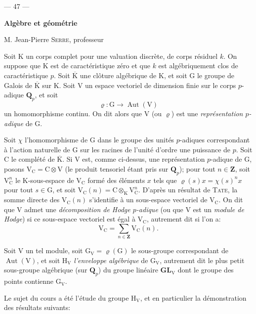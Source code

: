 \begin{center}--- 47 ---\end{center}

\begin{center}\textbf{Algèbre et géométrie}

M. Jean-Pierre \textsc{Serre}, professeur\end{center}

Soit $\mathrm K$ un corps complet pour une valuation discrète, de corps résiduel $k$. On suppose que $\mathrm K$ est de caractéristique zéro et que $k$ est algébriquement clos de caractéristique $p$. Soit $\overline{\mathrm K}$ une clôture algébrique de $\mathrm K$, et soit $\mathrm G$ le groupe de Galois de $\overline{\mathrm K}$ sur $\mathrm K$. Soit $\mathrm V$ un espace vectoriel de dimension finie sur le corps $p$-adique $\mathbf Q_p$, et soit
\[
\varrho:\mathrm G\to\operatorname{Aut}(\mathrm V)
\]
un homomorphisme continu. On dit alors que $\mathrm V$ (ou $\varrho$) est une \textit{représentation $p$-adique} de $\mathrm G$.

Soit $\chi$ l'homomorphisme de $\mathrm G$ dans le groupe des unités $p$-adiques correspondant à l'action naturelle de $\mathrm G$ sur les racines de l'unité d'ordre une puissance de $p$. Soit $\mathrm C$ le complété de $\overline{\mathrm K}$. Si $\mathrm V$ est, comme ci-dessus, une représentation $p$-adique de $\mathrm G$, posons $\mathrm V_{\mathrm C}=\mathrm C\otimes\mathrm V$ (le produit tensoriel étant pris sur $\mathbf Q_p$); pour tout $n\in\mathbf Z$, soit $\mathrm V_{\mathrm C}^n$ le $\mathrm K$-sous-espace de $\mathrm V_{\mathrm C}$ formé des éléments $x$ tels que $\varrho(s)x=\chi(s)^nx$ pour tout $s\in\mathrm G$, et soit $\mathrm V_{\mathrm C}(n)=\mathrm C\otimes_{\mathrm K}\mathrm V_{\mathrm C}^n$. D'après un résultat de \textsc{Tate}, la somme directe des $\mathrm V_{\mathrm C}(n)$ s'identifie à un sous-espace vectoriel de $\mathrm V_{\mathrm C}$. On dit que $\mathrm V$ admet une \textit{décomposition de Hodge $p$-adique} (ou que $\mathrm V$ est un \textit{module de Hodge}) si ce sous-espace vectoriel est égal à $\mathrm V_{\mathrm C}$, autrement dit si l'on a:
\[
\mathrm V_{\mathrm C}=\sum_{n\in\mathbf Z}\mathrm V_{\mathrm C}(n).
\]

Soit $\mathrm V$ un tel module, soit $\mathrm G_{\mathrm V}=\varrho(\mathrm G)$ le sous-groupe correspondant de $\operatorname{Aut}(\mathrm V)$, et soit $\mathrm H_{\mathrm V}$ \textit{l'enveloppe algébrique} de $\mathrm G_{\mathrm V}$, autrement dit le plus petit sous-groupe algébrique (sur $\mathbf Q_p$) du groupe linéaire $\mathbf{GL}_{\mathrm V}$ dont le groupe des points contienne $\mathrm G_{\mathrm V}$.

Le sujet du cours a été l'étude du groupe $\mathrm H_{\mathrm V}$, et en particulier la démonstration des résultats suivants:
